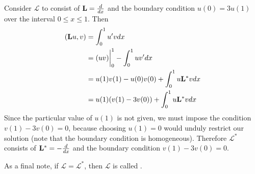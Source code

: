 \begin{example}
	Consider \(\mathcal{L}\) to consist of \(\mathrm{\bf{L}}=\frac{d}{dx}\) and the boundary condition \(u(0)=3u(1)\) over the interval \(0\leq x \leq 1\). Then
	\begin{equation}
		\begin{split}
			(\mathrm{\bf{L}} u,v) &= \int_0^1u'vdx\\
			       &= (uv)\biggr\rvert_0^1 - \int_0^1 uv'dx\\
			       &= u(1)v(1)-u(0)v(0)+\int_0^1u\mathrm{\bf{L^*}} vdx\\
			       &= u(1)(v(1)-3v(0)) + \int_0^1u\mathrm{\bf{L^*}} vdx
		\end{split}
	\end{equation}
	Since the particular value of \(u(1)\) is not given, we must impose the condition \(v(1)-3v(0)=0\), because choosing \(u(1)=0\) would unduly restrict our solution (note that the boundary condition is homogeneous). Therefore \(\mathcal{L^*}\) consists of \(\mathrm{\bf{L^*}} = -\frac{d}{dx}\) and the boundary condition \(v(1) - 3v(0)=0\). 
\end{example}As a final note, if \(\mathcal{L}=\mathcal{L}^*\), then \(\mathcal{L}\) is called .
